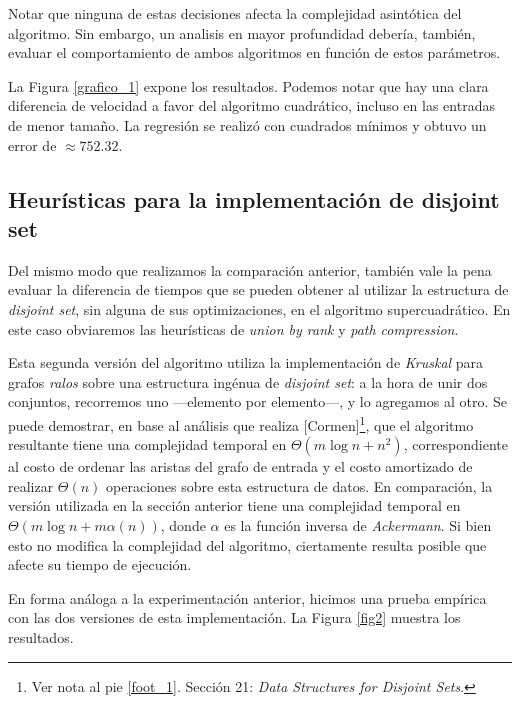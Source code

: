 Notar que ninguna de estas decisiones afecta la complejidad asintótica del algoritmo. Sin embargo, un analisis en mayor profundidad debería, también, evaluar el comportamiento de ambos algoritmos en función de estos parámetros.

La Figura \ref{grafico_1} expone los resultados. Podemos notar que hay una clara diferencia de velocidad a favor del algoritmo cuadrático, incluso en las entradas de menor tamaño. La regresión se realizó con cuadrados mínimos y obtuvo un error de $\approx 752.32$. %

\subsection{Heurísticas para la implementación de disjoint set}

Del mismo modo que realizamos la comparación anterior, también vale la pena evaluar la diferencia de tiempos que se pueden obtener al utilizar la estructura de \textit{disjoint set}, sin alguna de sus optimizaciones, en el algoritmo supercuadrático. En este caso obviaremos las heurísticas de \textit{union by rank} y \textit{path compression}. 

Esta segunda versión del algoritmo utiliza la implementación de \textit{Kruskal} para grafos \textit{ralos} sobre una estructura ingénua de \textit{disjoint set}: a la hora de unir dos conjuntos, recorremos uno ---elemento por elemento---, y lo agregamos al otro. Se puede demostrar, en base al análisis que realiza [Cormen]\footnote{Ver nota al pie \ref{foot_1}. Sección 21: \textit{Data Structures for Disjoint Sets}.}, que el algoritmo resultante tiene una complejidad temporal en $\Theta(m\log n + n^2)$, correspondiente al costo de ordenar las aristas del grafo de entrada y el costo amortizado de realizar $\Theta(n)$ operaciones sobre esta estructura de datos. En comparación, la versión utilizada en la sección anterior tiene una complejidad temporal en $\Theta(m\log n + m\alpha(n))$, donde $\alpha$ es la función inversa de \textit{Ackermann}. Si bien esto no modifica la complejidad del algoritmo, ciertamente resulta posible que afecte su tiempo de ejecución.

En forma análoga a la experimentación anterior, hicimos una prueba empírica con las dos versiones de esta implementación. La Figura \ref{fig2} muestra los resultados.


